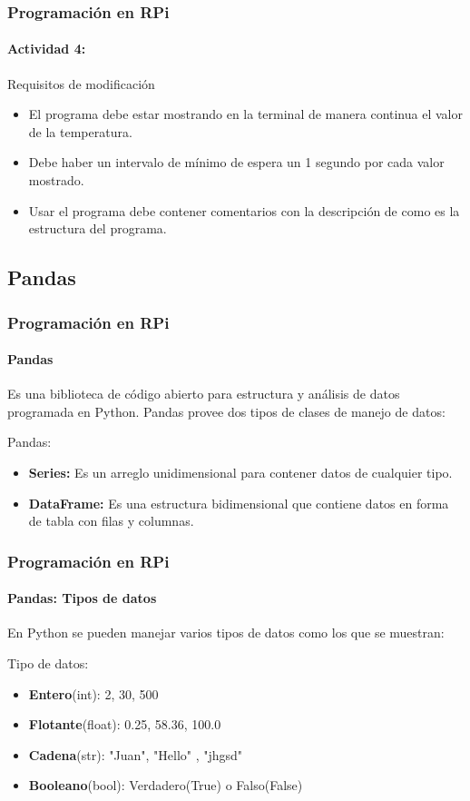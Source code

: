 \documentclass{beamer}
\begin{document}
	\begin{frame}
		\frametitle{Programación en RPi}
		\framesubtitle{Actividad 4:}
		\begin{mybox}{Requisitos de modificación}
			\begin{itemize}
				\item El programa debe estar mostrando en la terminal de manera continua el valor de la temperatura.
				\item Debe haber un intervalo de mínimo de espera un 1 segundo por cada valor mostrado.
				\item Usar el programa debe contener comentarios con la descripción de como es la estructura del programa.
			\end{itemize}
		\end{mybox}
	\end{frame}
	\subsection{Pandas}
	\begin{frame}
		\frametitle{Programación en RPi}
		\framesubtitle{Pandas}
		Es una biblioteca de código abierto para estructura y análisis de datos programada en Python.
		\newline
		Pandas provee dos tipos de clases de manejo de datos:
		\begin{mybox}{Pandas:}
			 \begin{itemize}
			 	\item \textbf{Series:} Es un arreglo unidimensional para contener datos de cualquier tipo.
			 	\item \textbf{DataFrame:} Es una estructura bidimensional que contiene datos en forma de tabla con filas y columnas.
			 \end{itemize}
		\end{mybox}
	\end{frame}
	\begin{frame}
		\frametitle{Programación en RPi}
		\framesubtitle{Pandas: Tipos de datos}
		En Python se pueden manejar varios tipos de datos como los que se muestran:
		\newline
		\begin{mybox}{Tipo de datos:}
			\begin{itemize}
				\item \textbf{Entero}(int):  2, 30, 500
				\item \textbf{Flotante}(float): 0.25, 58.36, 100.0
				\item \textbf{Cadena}(str): "Juan",  "Hello" , "jhgsd"
				\item \textbf{Booleano}(bool): Verdadero(True) o Falso(False) 
			\end{itemize}
		\end{mybox}
	\end{frame}
\end{document}
